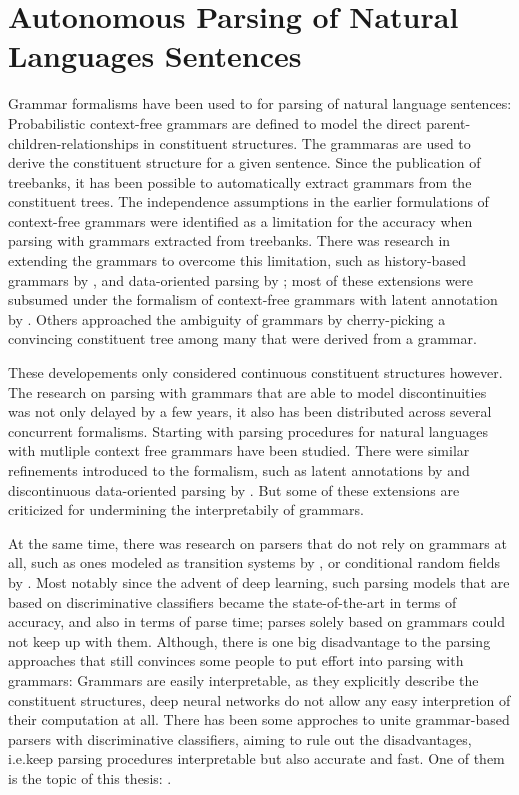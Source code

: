 \documentclass[../document.tex]{subfiles}
\begin{document}
    \section*{Autonomous Parsing of Natural Languages Sentences}
    Grammar formalisms have been used to for parsing of natural language sentences:
        Probabilistic context-free grammars are defined to model the direct parent-children-relationships in constituent structures.
        The grammaras are used to derive the constituent structure for a given sentence. \citep{Sup72}
    Since the publication of treebanks, it has been possible to automatically extract grammars from the constituent trees.
    The independence assumptions in the earlier formulations of context-free grammars were identified as a limitation for the accuracy when parsing with grammars extracted from treebanks. \citep[e.g.\@][Section~1.1]{collins2001convolution}
    There was research in extending the grammars to overcome this limitation, such as history-based grammars by \citet{Black94}, and data-oriented parsing by \citet{Bod92}; most of these extensions were subsumed under the formalism of context-free grammars with latent annotation by \citet{Mat05,Petrov06}.
    Others approached the ambiguity of grammars by cherry-picking a convincing constituent tree among many that were derived from a grammar. \citep{Col00}
    
    These developements only considered continuous constituent structures however.
    The research on parsing with grammars that are able to model discontinuities was not only delayed by a few years, it also has been distributed across several concurrent formalisms.
    Starting with \citet{MaierSogaard08,Kal10} parsing procedures for natural languages with mutliple context free grammars have been studied.
    There were similar refinements introduced to the formalism, such as latent annotations by \citet{Geb20} and discontinuous data-oriented parsing by \citet{Cra11}.
    But some of these extensions are criticized for undermining the interpretabily of grammars. \cite[Chapter 9]{Geb20}
    
    At the same time, there was research on parsers that do not rely on grammars at all, such as ones modeled as transition systems by \citet{Verseley14,CoaCoh19}, or conditional random fields by \citet{Petrov08}.
    Most notably since the advent of deep learning, such parsing models that are based on discriminative classifiers became the state-of-the-art in terms of accuracy, and also in terms of parse time; parses solely based on grammars could not keep up with them.
    Although, there is one big disadvantage to the parsing approaches that still convinces some people to put effort into parsing with grammars:
        Grammars are easily interpretable, as they explicitly describe the constituent structures, deep neural networks do not allow any easy interpretion of their computation at all.
    There has been some approches to unite grammar-based parsers with discriminative classifiers, aiming to rule out the disadvantages, i.e.\@ keep parsing procedures interpretable but also accurate and fast.
    One of them is the topic of this thesis: .
    
\end{document}
